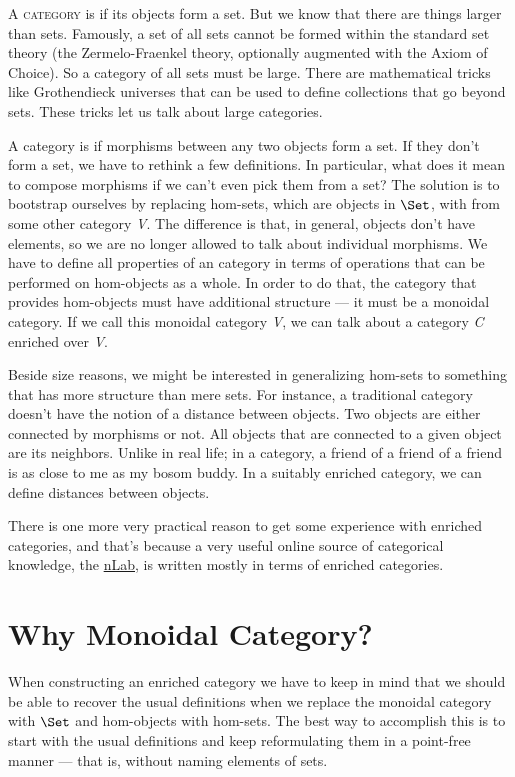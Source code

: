 \lettrine[lhang=0.17]{A}{ category} is  if its objects form a set. But we know that
there are things larger than sets. Famously, a set of all sets cannot be
formed within the standard set theory (the Zermelo-Fraenkel theory,
optionally augmented with the Axiom of Choice). So a category of all
sets must be large. There are mathematical tricks like Grothendieck
universes that can be used to define collections that go beyond sets.
These tricks let us talk about large categories.

A category is  if morphisms between any two objects
form a set. If they don't form a set, we have to rethink a few
definitions. In particular, what does it mean to compose morphisms if we
can't even pick them from a set? The solution is to bootstrap ourselves
by replacing hom-sets, which are objects in $\Set$, with
 from some other category \emph{V}. The difference is
that, in general, objects don't have elements, so we are no longer
allowed to talk about individual morphisms. We have to define all
properties of an  category in terms of operations that
can be performed on hom-objects as a whole. In order to do that, the
category that provides hom-objects must have additional structure --- it
must be a monoidal category. If we call this monoidal category \emph{V},
we can talk about a category \emph{C} enriched over \emph{V}.

Beside size reasons, we might be interested in generalizing hom-sets to
something that has more structure than mere sets. For instance, a
traditional category doesn't have the notion of a distance between
objects. Two objects are either connected by morphisms or not. All
objects that are connected to a given object are its neighbors. Unlike
in real life; in a category, a friend of a friend of a friend is as
close to me as my bosom buddy. In a suitably enriched category, we can
define distances between objects.

There is one more very practical reason to get some experience with
enriched categories, and that's because a very useful online source of
categorical knowledge, the \href{https://ncatlab.org/}{nLab}, is written
mostly in terms of enriched categories.

\section{Why Monoidal Category?}\label{why-monoidal-category}

When constructing an enriched category we have to keep in mind that we
should be able to recover the usual definitions when we replace the
monoidal category with $\Set$ and hom-objects with hom-sets. The
best way to accomplish this is to start with the usual definitions and
keep reformulating them in a point-free manner --- that is, without
naming elements of sets.

